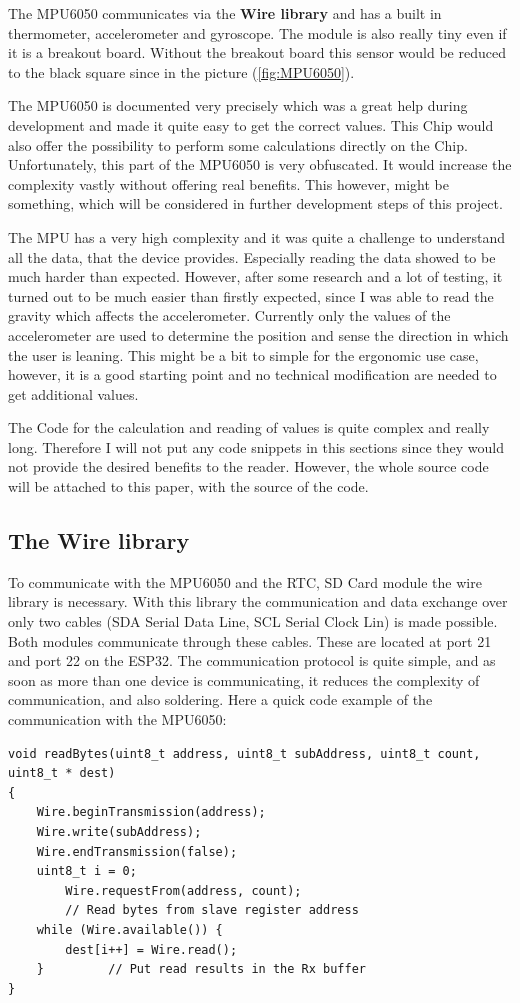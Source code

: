 The MPU6050 communicates via the \textbf{Wire library} and has a built in thermometer, accelerometer and gyroscope. The module is also really tiny even if it is a breakout board.
Without the breakout board this sensor would be reduced to the black square since in the picture  (\ref{fig:MPU6050}).

The MPU6050 is documented very precisely which was a great help during development and made it quite easy to get the correct values. This Chip would also offer the possibility to perform some calculations directly on the Chip. Unfortunately, this part of the MPU6050 is very obfuscated. It would increase the complexity vastly without offering real benefits. This however, might be something, which will be considered in further development steps of this project.

The MPU has a very high complexity and it was quite a challenge to understand all the data, that the device provides. Especially reading the data showed to be much harder than expected. However, after some research and a lot of testing, it turned out to be much easier than firstly expected, since I was able to read the gravity which affects the accelerometer.
Currently only the values of the accelerometer are used to determine the position and sense the direction in which the user is leaning. This might be a bit to simple for the ergonomic use case, however, it is a good starting point and no technical modification are needed to get additional values.

The Code for the calculation and reading of values is quite complex and really long. Therefore I will not put any code snippets in this sections since they would not provide the desired benefits to the reader. However, the whole source code will be attached to this paper, with the source of the code. \cite{TDKAttra32:online}

\newpage

\subsection{The Wire library}

To communicate with the MPU6050 and the RTC, SD Card module the wire library is necessary. With this library the communication and data exchange over only two cables (SDA Serial Data Line, SCL Serial Clock Lin) is made possible. Both modules communicate through these cables. These are located at port 21 and port 22 on the ESP32. The communication protocol is quite simple, and as soon as more than one device is communicating, it reduces the complexity of communication, and also soldering. Here a quick code example of the communication with the MPU6050:
\begin{lstlisting}
void readBytes(uint8_t address, uint8_t subAddress, uint8_t count, uint8_t * dest)
{  
	Wire.beginTransmission(address);   
	Wire.write(subAddress);            
	Wire.endTransmission(false);       
	uint8_t i = 0;
        Wire.requestFrom(address, count);  
        // Read bytes from slave register address 
	while (Wire.available()) {
        dest[i++] = Wire.read(); 
    }         // Put read results in the Rx buffer
}
\end{lstlisting}
\cite{MPU9250M94:online}

